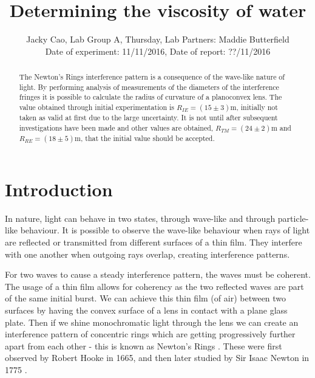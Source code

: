 \documentclass[twocolumn]{revtex4}
\begin{document}
\textheight=26.385cm

\title{Determining the viscosity of water} 
 
 
\author{Jacky Cao, Lab Group A, Thursday, Lab Partners: Maddie Butterfield\\ Date of experiment: 11/11/2016, Date of report: ??/11/2016}


\begin{abstract}              
 
The Newton's Rings interference pattern is a consequence of the wave-like nature of light. By performing analysis of measurements of the diameters of the interference fringes it is possible to calculate the radius of curvature of a planoconvex lens. The value obtained through initial experimentation is $R_{IE}=(15\pm3)$m, initially not taken as valid at first due to the large uncertainty. It is not until after subsequent investigations have been made and other values are obtained, $R_{TM}=(24\pm2)$m and $R_{RE}=(18\pm5)$m, that the initial value should be accepted. 

\end{abstract}

\maketitle

\section{Introduction} 
\vspace{-2ex} 
In nature, light can behave in two states, through wave-like and through particle-like behaviour. It is possible to observe the wave-like behaviour when rays of light are reflected or transmitted from different surfaces of a thin film. They interfere with one another when outgoing rays overlap, creating interference patterns. 

For two waves to cause a steady interference pattern, the waves must be coherent. The usage of a thin film allows for coherency as the two reflected waves are part of the same initial burst. We can achieve this thin film (of air) between two surfaces by having the convex surface of a lens in contact with a plane glass plate. Then if we shine monochromatic light through the lens we can create an interference pattern of concentric rings which are getting progressively further apart from each other - this is known as Newton's Rings \cite{lens}. These were first observed by Robert Hooke in 1665, and then later studied by Sir Isaac Newton in 1775 \cite{labscript}.
\end{document}
